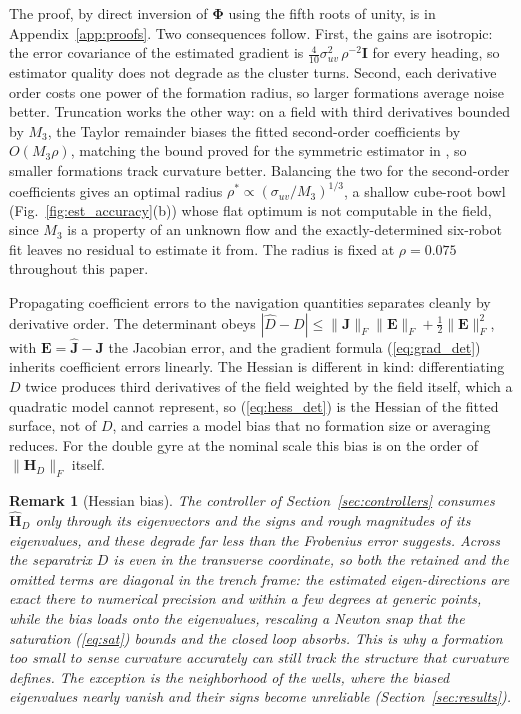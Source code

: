 \documentclass[lettersize,journal]{IEEEtran}
\newtheorem{remark}{Remark}
\begin{document}
The proof, by direct inversion of $\boldsymbol{\Phi}$ using the fifth
roots of unity, is in Appendix~\ref{app:proofs}. Two consequences
follow. First, the gains are isotropic: the error covariance of the
estimated gradient is $\tfrac{4}{10}\sigma_{uv}^2\,\rho^{-2}\mathbf{I}$
for every heading, so estimator quality does not degrade as the cluster
turns. Second, each derivative order costs one power of the formation
radius, so larger formations average noise better. Truncation works the
other way: on a field with third derivatives bounded by $M_3$, the
Taylor remainder biases the fitted second-order coefficients by $O(M_3
\rho)$, matching the bound proved for the symmetric estimator in
\cite{15}, so smaller formations track curvature better. Balancing the two for the
second-order coefficients gives an optimal radius $\rho^* \propto
(\sigma_{uv}/M_3)^{1/3}$, a shallow cube-root bowl (Fig.~\ref{fig:est_accuracy}(b))
whose flat optimum is not computable in the field, since $M_3$ is a
property of an unknown flow and the exactly-determined six-robot fit
leaves no residual to estimate it from. The radius is fixed at $\rho =
0.075$ throughout this paper.

Propagating coefficient errors to the navigation quantities separates
cleanly by derivative order. The determinant obeys $|\hat{D} - D| \leq
\|\mathbf{J}\|_F \|\mathbf{E}\|_F + \tfrac{1}{2}\|\mathbf{E}\|_F^2$,
with $\mathbf{E} = \hat{\mathbf{J}} - \mathbf{J}$ the Jacobian error,
and the gradient formula (\ref{eq:grad_det}) inherits coefficient
errors linearly. The Hessian is different in kind: differentiating $D$
twice produces third derivatives of the field weighted by the field
itself, which a quadratic model cannot represent, so
(\ref{eq:hess_det}) is the Hessian of the fitted surface, not of $D$,
and carries a model bias that no formation size or averaging reduces.
For the double gyre at the nominal scale this bias is on the order of
$\|\mathbf{H}_D\|_F$ itself.

\begin{remark}[Hessian bias]
\label{rem:eigvec}
The controller of Section~\ref{sec:controllers} consumes
$\hat{\mathbf{H}}_D$ only through its eigenvectors and the signs and
rough magnitudes of its eigenvalues, and these degrade far less than
the Frobenius error suggests. Across the separatrix $D$ is even in the
transverse coordinate, so both the retained and the omitted terms are
diagonal in the trench frame: the estimated eigen-directions are exact
there to numerical precision and within a few degrees at generic
points, while the bias loads onto the eigenvalues, rescaling a Newton
snap that the saturation (\ref{eq:sat}) bounds and the closed loop
absorbs. This is why a formation too small to sense curvature
accurately can still track the structure that curvature defines. The
exception is the neighborhood of the wells, where the biased
eigenvalues nearly vanish and their signs become unreliable
(Section~\ref{sec:results}).
\end{remark}
\end{document}
